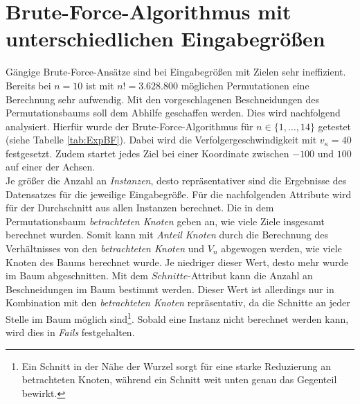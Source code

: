 \documentclass[german,version-2019-11]{uzl-thesis}
\begin{document}
\section{Brute-Force-Algorithmus mit unterschiedlichen Eingabegrößen}

Gängige Brute-Force-Ansätze sind bei Eingabegrößen mit Zielen sehr ineffizient. Bereits bei $n=10$ ist mit $n!=3.628.800$ möglichen Permutationen eine Berechnung sehr aufwendig. Mit den vorgeschlagenen Beschneidungen des Permutationsbaums soll dem Abhilfe geschaffen werden. Dies wird nachfolgend analysiert. Hierfür wurde der Brute-Force-Algorithmus für $n\in\{1,\dots,14\}$ getestet (siehe Tabelle \ref{tab:ExpBF}). Dabei wird die Verfolgergeschwindigkeit mit $v_{\kappa}=40$ festgesetzt. Zudem startet jedes Ziel bei einer Koordinate zwischen $-100$ und $100$ auf einer der Achsen. \\
Je größer die Anzahl an \emph{Instanzen}, desto repräsentativer sind die Ergebnisse des Datensatzes für die jeweilige Eingabegröße. Für die nachfolgenden Attribute wird für der Durchschnitt aus allen Instanzen berechnet. Die in dem Permutationsbaum \emph{betrachteten Knoten} geben an, wie viele Ziele insgesamt berechnet wurden. Somit kann mit \emph{Anteil Knoten} durch die Berechnung des Verhältnisses von den \emph{betrachteten Knoten} und $V_n$ abgewogen werden, wie viele Knoten des Baums berechnet wurde. Je niedriger dieser Wert, desto mehr wurde im Baum abgeschnitten. Mit dem $Schnitte$-Attribut kann die Anzahl an Beschneidungen im Baum bestimmt werden. Dieser Wert ist allerdings nur in Kombination mit den \emph{betrachteten Knoten} repräsentativ, da die Schnitte an jeder Stelle im Baum möglich sind\footnote{Ein Schnitt in der Nähe der Wurzel sorgt für eine starke Reduzierung an betrachteten Knoten, während ein Schnitt weit unten genau das Gegenteil bewirkt.}. Sobald eine Instanz nicht berechnet werden kann, wird dies in \emph{Fails} festgehalten.
\end{document}
